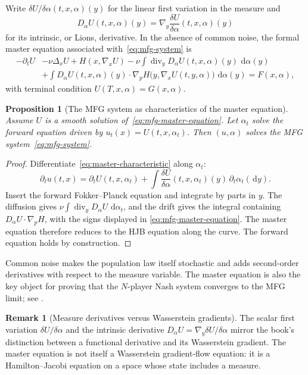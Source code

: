 \documentclass[11pt,a4paper]{article}
\newtheorem{proposition}[theorem]{Proposition}
\theoremstyle{definition}
\newtheorem{remark}[theorem]{Remark}
\newcommand{\diverg}{\operatorname{div}}
\newcommand{\dd}{\,\mathrm d}
\newcommand{\al}{\alpha}
\begin{document}
Write $\delta U/\delta\al(t,x,\al)(y)$ for the linear first variation in the
measure and
\begin{equation}\label{eq:lions-intrinsic-derivative}
  D_\al U(t,x,\al)(y)
  =\nabla_y\frac{\delta U}{\delta\al}(t,x,\al)(y)
\end{equation}
for its intrinsic, or Lions, derivative.  In the absence of common noise, the
formal master equation associated with~\eqref{eq:mfg-system} is
\begin{align}\label{eq:mfg-master-equation}
 -\partial_tU
 &-\nu\Delta_xU+H(x,\nabla_xU)
 -\nu\int\diverg_yD_\al U(t,x,\al)(y)\,\dd\al(y)\nonumber\\
 &+\int D_\al U(t,x,\al)(y)\cdot
   \nabla_pH\bigl(y,\nabla_xU(t,y,\al)\bigr)\,\dd\al(y)
 =F(x,\al),
\end{align}
with terminal condition $U(T,x,\al)=G(x,\al)$.

\begin{proposition}[The MFG system as characteristics of the master equation]
\label{prop:master-characteristics}
Assume $U$ is a smooth solution of~\eqref{eq:mfg-master-equation}.  Let
$\al_t$ solve the forward equation driven by
$u_t(x)=U(t,x,\al_t)$.  Then $(u,\al)$ solves the MFG
system~\eqref{eq:mfg-system}.
\end{proposition}

\begin{proof}
Differentiate~\eqref{eq:master-characteristic} along $\al_t$:
\[
  \partial_tu(t,x)=\partial_tU(t,x,\al_t)
  +\int\frac{\delta U}{\delta\al}(t,x,\al_t)(y)
       \,\partial_t\al_t(\dd y).
\]
Insert the forward Fokker--Planck equation and integrate by parts in $y$.
The diffusion gives
$\nu\int\diverg_yD_\al U\,\dd\al_t$, and the drift gives the integral
containing $D_\al U\cdot\nabla_pH$, with the signs displayed in
\eqref{eq:mfg-master-equation}.  The master equation therefore reduces to the
HJB equation along the curve.  The forward equation holds by construction.
\end{proof}

Common noise makes the population law itself stochastic and adds second-order
derivatives with respect to the measure variable.  The master equation is also
the key object for proving that the $N$-player Nash system converges to the
MFG limit; see \citet{CardaliaguetDelarueLasryLions2019}.

\begin{remark}[Measure derivatives versus Wasserstein gradients]
The scalar first variation $\delta U/\delta\al$ and the intrinsic derivative
$D_\al U=\nabla_y\delta U/\delta\al$ mirror the book's distinction between a
functional derivative and its Wasserstein gradient.  The master equation is
not itself a Wasserstein gradient-flow equation: it is a Hamilton--Jacobi
equation on a space whose state includes a measure.
\end{remark}
\end{document}
